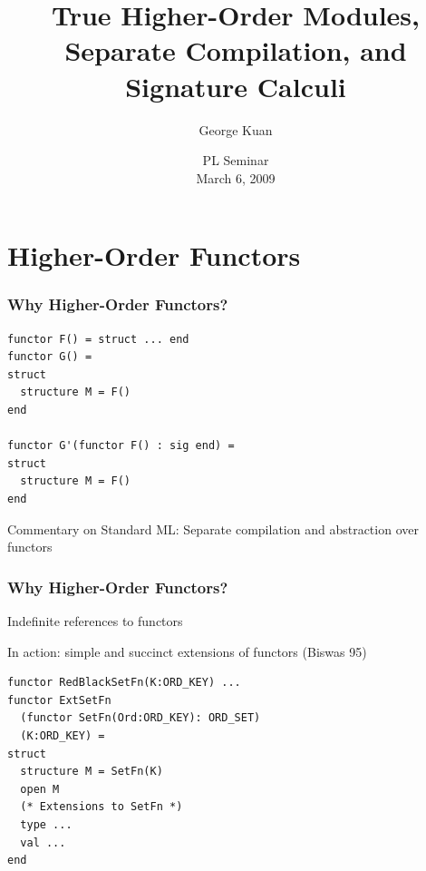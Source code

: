 \documentclass{beamer}
\title[Higher-Order Modules, Sep. Comp., and Signatures]{True Higher-Order Modules, Separate Compilation, and Signature Calculi}
\author{George Kuan}
\institute{University of Chicago}
\date{PL Seminar\\March 6, 2009}
\begin{document}
\begin{frame}
  \titlepage
\end{frame}


\section{Higher-Order Functors}

\begin{frame}[fragile]
\frametitle{Why Higher-Order Functors?}
\begin{lstlisting}
functor F() = struct ... end
functor G() = 
struct
  structure M = F()
end
	
functor G'(functor F() : sig end) =
struct
  structure M = F()
end
\end{lstlisting}	
Commentary on Standard ML: Separate compilation and abstraction over functors
\end{frame}

\begin{frame}[fragile]
\frametitle{Why Higher-Order Functors?}
Indefinite references to functors 

\begin{block}{In action: simple and succinct extensions of functors (Biswas 95)}
\begin{lstlisting}
functor RedBlackSetFn(K:ORD_KEY) ...
functor ExtSetFn
  (functor SetFn(Ord:ORD_KEY): ORD_SET) 
  (K:ORD_KEY) =
struct
  structure M = SetFn(K)
  open M
  (* Extensions to SetFn *)
  type ...
  val ...
end 	
\end{lstlisting}
\end{block}	 
\end{frame}
\end{document}
